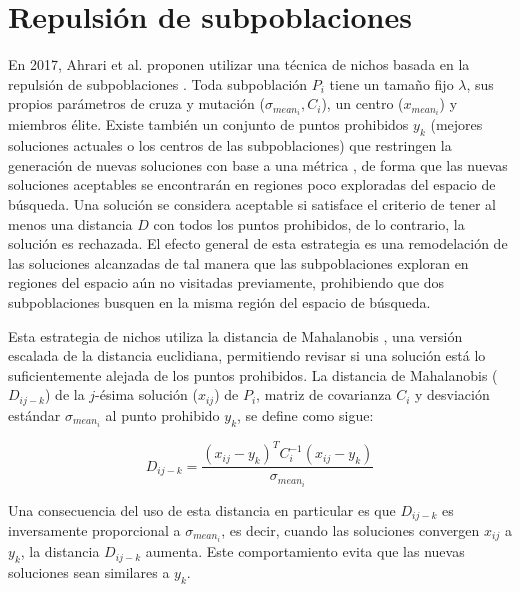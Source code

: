 \section{Repulsión de subpoblaciones}

En 2017, Ahrari et al. proponen utilizar una técnica de nichos basada en la repulsión de subpoblaciones \cite{ahrari2016multimodal}. Toda subpoblación $P_i$ tiene un tamaño fijo $\lambda$,
sus propios parámetros de cruza y mutación ($\sigma_{mean_i},C_i$), un centro ($x_{mean_i}$) y miembros élite. Existe también un conjunto de puntos prohibidos $y_k$
(mejores soluciones actuales o los centros de las subpoblaciones) que restringen la generación de nuevas soluciones con base a una métrica \cite{mahalanobis1936generalised}, de forma que las nuevas soluciones aceptables
se encontrarán en regiones poco exploradas del espacio de búsqueda. Una solución se considera aceptable si satisface el criterio de tener al menos una distancia $D$ con todos los puntos prohibidos, de lo contrario,
la solución es rechazada. El efecto general de esta estrategia es una remodelación de las soluciones alcanzadas de tal manera que las subpoblaciones exploran en regiones del espacio
aún no visitadas previamente, prohibiendo que dos subpoblaciones busquen en la misma región del espacio de búsqueda.
\newline

Esta estrategia de nichos utiliza la distancia de Mahalanobis \cite{mahalanobis1936generalised}, una versión escalada de la distancia euclidiana, permitiendo revisar si una solución está lo suficientemente
alejada de los puntos prohibidos. La distancia de Mahalanobis ($D_{ij-k}$) de la $j$-ésima solución ($x_{ij}$) de $P_i$, matriz de covarianza $C_i$ y desviación estándar $\sigma_{mean_i}$ al punto prohibido
$y_k$, se define como sigue:

$$D_{ij-k} = \frac{(x_{ij}-y_k)^T C^{-1}_i (x_{ij}-y_k)}{\sigma_{mean_i}}$$

Una consecuencia del uso de esta distancia en particular es que $D_{ij-k}$ es inversamente proporcional a $\sigma_{mean_i}$, es decir, cuando las soluciones convergen $x_{ij}$ a $y_k$,
la distancia $D_{ij-k}$ aumenta. Este comportamiento evita que las nuevas soluciones sean similares a $y_k$.

